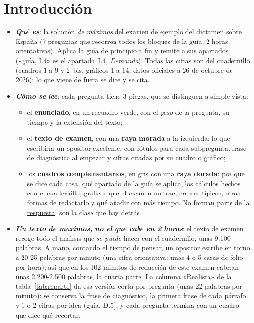 \section*{Introducción}

\begin{itemize}
\item \textbf{\emph{Qué es}}: la solución \emph{de máximos} del examen de ejemplo del dictamen sobre España (7 preguntas que recorren todos los bloques de la guía, 2 horas orientativas). Aplica la guía de principio a fin y remite a sus apartados («guía, I.4» es el apartado~I.4, \emph{Demanda}). Todas las cifras son del cuadernillo (cuadros 1 a 9 y 2~bis, gráficos 1 a 14, datos oficiales a 26 de octubre de 2026); lo que viene de fuera se dice y se cita.
\item \textbf{\emph{Cómo se lee}}: cada pregunta tiene 3 piezas, que se distinguen a simple vista:
  \begin{itemize}
  \item el \textbf{enunciado}, en un recuadro verde, con el \emph{peso} de la pregunta, su tiempo y la extensión del texto;
  \item el \textbf{texto de examen}, con una \textcolor{tceemorado}{\textbf{raya morada}} a la izquierda: lo que escribiría un opositor excelente, con rótulos para cada subpregunta, frase de diagnóstico al empezar y cifras citadas por su cuadro o gráfico;
  \item los \textbf{cuadros complementarios}, en gris con una \textcolor{tceedorado}{\textbf{raya dorada}}: por qué se dice cada cosa, qué apartado de la guía se aplica, los cálculos hechos con el cuadernillo, gráficos que el examen no trae, errores típicos, otras formas de redactarlo y qué añadir con más tiempo. \uline{No forman parte de la respuesta}: son la clase que hay detrás.
  \end{itemize}
\item \textbf{\emph{Un texto de máximos, no el que cabe en 2 horas}}: el texto de examen recoge todo el análisis que \emph{se puede} hacer con el cuadernillo, unas 9.100 palabras. A mano, contando el tiempo de pensar, un opositor escribe en torno a 20-25 palabras por minuto (una cifra orientativa: unas 4 o 5 caras de folio por hora), así que en los 102 minutos de redacción de este examen cabrían unas 2.200-2.500 palabras, la cuarta parte. La columna «Realista» de la tabla~\ref{tab:reparto} da esa versión corta por pregunta (unas 22 palabras por minuto): se conserva la frase de diagnóstico, la primera frase de cada párrafo y 1 o 2 cifras por idea (guía, D.5), y cada pregunta termina con un cuadro que dice qué recortar.

\end{itemize}
